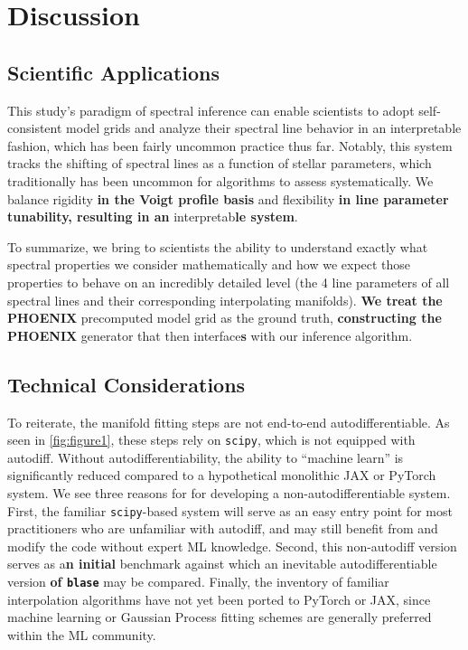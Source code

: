 \documentclass[twocolumn, linenumbers]{aastex631}
\begin{document}
\section{Discussion}
\subsection{Scientific Applications}
This study's paradigm of spectral inference can enable scientists to adopt self-consistent model grids and analyze their spectral line behavior in an interpretable fashion, which has been fairly uncommon practice thus far.
Notably, this system tracks the shifting of spectral lines as a function of stellar parameters, which traditionally has been uncommon for algorithms to assess systematically.
We balance rigidity \textbf{in the Voigt profile basis} and flexibility \textbf{in line parameter tunability, resulting in an} interpretab\textbf{le system}.

To summarize, we bring to scientists the ability to understand exactly what spectral properties we consider mathematically and how we expect those properties to behave on an incredibly detailed level (the 4 line parameters of all spectral lines and their corresponding interpolating manifolds). \textbf{We treat the PHOENIX} precomputed model grid as the ground truth, \textbf{constructing the PHOENIX} generator that then interface\textbf{s} with our inference algorithm.

\subsection{Technical Considerations}
To reiterate, the manifold fitting steps are not end-to-end autodifferentiable.
As seen in \autoref{fig:figure1}, these steps rely on \texttt{scipy}, which is not equipped with autodiff.
Without autodifferentiability, the ability to ``machine learn'' is significantly reduced compared to a hypothetical monolithic JAX or PyTorch system.
We see three reasons for for developing a non-autodifferentiable system.
First, the familiar \texttt{scipy}-based system will serve as an easy entry point for most practitioners who are unfamiliar with autodiff, and may still benefit from and modify the code without expert ML knowledge.
Second, this non-autodiff version serves as a\textbf{n initial} benchmark against which an inevitable autodifferentiable version \textbf{of \texttt{blase}} may be compared.
Finally, the inventory of familiar interpolation algorithms have not yet been ported to PyTorch or JAX, since machine learning or Gaussian Process fitting schemes are generally preferred within the ML community.
\end{document}
